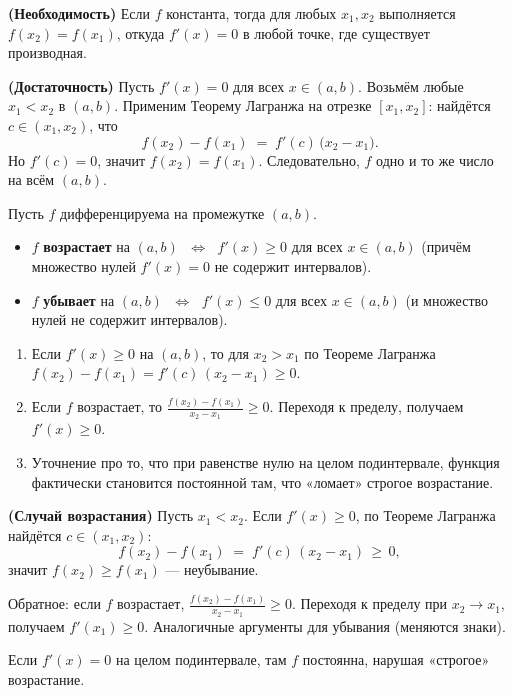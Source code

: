 \begin{customproof}
	\textbf{(Необходимость)} Если $f$ константа, тогда для любых $x_1,x_2$ выполняется
	$f(x_2)=f(x_1)$, откуда $f'(x)=0$ в любой точке, где существует производная.

	\smallskip

	\textbf{(Достаточность)} Пусть $f'(x)=0$ для всех $x\in(a,b)$. Возьмём любые
	$x_1<x_2$ в $(a,b)$. Применим Теорему Лагранжа на отрезке $[x_1,x_2]$: найдётся
	$c\in(x_1,x_2)$, что
	\[
		f(x_2)-f(x_1) \;=\; f'(c)\,\bigl(x_2-x_1\bigr).
	\]
	Но $f'(c)=0$, значит $f(x_2)=f(x_1)$. Следовательно, $f$ одно и то же число
	на всём $(a,b)$.
\end{customproof}

\begin{customtheorem}
	Пусть $f$ дифференцируема на промежутке $(a,b)$.
	\begin{itemize}
		\item $f$ \textbf{возрастает} на $(a,b)$
		      $\;\Longleftrightarrow\;$
		      $f'(x)\ge 0$ для всех $x\in(a,b)$
		      (причём множество нулей $f'(x)=0$ не содержит интервалов).
		\item $f$ \textbf{убывает} на $(a,b)$
		      $\;\Longleftrightarrow\;$
		      $f'(x)\le 0$ для всех $x\in(a,b)$
		      (и множество нулей не содержит интервалов).
	\end{itemize}
\end{customtheorem}

\begin{proofplan}
	\begin{enumerate}
		\item Если $f'(x)\ge 0$ на $(a,b)$, то для $x_2>x_1$ по Теореме Лагранжа
		      $f(x_2)-f(x_1)=f'(c)\,(x_2-x_1)\ge 0$.
		\item Если $f$ возрастает, то
		      \(\tfrac{f(x_2)-f(x_1)}{\,x_2-x_1\,}\ge 0\). Переходя к пределу, получаем $f'(x)\ge0$.
		\item Уточнение про то, что при равенстве нулю на целом подинтервале, функция
		      фактически становится постоянной там, что «ломает» строгое возрастание.
	\end{enumerate}
\end{proofplan}

\begin{customproof}
	\textbf{(Случай возрастания)}
	Пусть $x_1 < x_2$.
	Если $f'(x)\ge 0$, по Теореме Лагранжа найдётся $c\in(x_1,x_2)$:
	\[
		f(x_2)-f(x_1) \;=\; f'(c)\,(x_2-x_1)\,\ge\,0,
	\]
	значит $f(x_2)\ge f(x_1)$ — неубывание.

	Обратное: если $f$ возрастает,
	\(\tfrac{f(x_2)-f(x_1)}{x_2-x_1}\ge0\). Переходя к пределу при $x_2\to x_1$,
	получаем $f'(x_1)\ge0$. Аналогичные аргументы для убывания (меняются знаки).

	Если $f'(x)=0$ на целом подинтервале, там $f$ постоянна, нарушая «строгое» возрастание.

\end{customproof}

